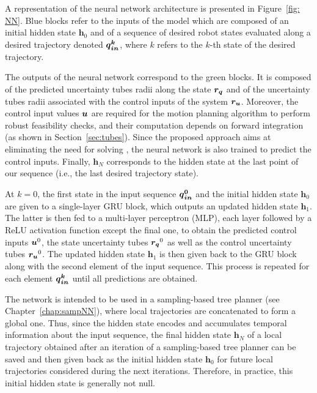 A representation of the neural network architecture is presented in Figure~\ref{fig: NN}.
Blue blocks refer to the inputs of the model which are composed of an initial hidden state $\boldsymbol{h}_{0}$ and of a sequence of desired robot states evaluated along a desired trajectory denoted $\boldsymbol{\boldsymbol{q}_{in}^k}$, where $k$ refers to the $k$-th state of the desired trajectory. 

The outputs of the neural network correspond to the green blocks.
It is composed of the predicted uncertainty tubes radii along the state $\boldsymbol{r_q}$ and of the uncertainty tubes radii associated with the control inputs of the system $\boldsymbol{r_u}$.
Moreover, the control input values $\boldsymbol{u}$ are required for the motion planning algorithm to perform robust feasibility checks, and their computation depends on  forward integration (as shown in Section~\ref{sec:tubes}). 
Since the proposed approach aims at eliminating the need for solving , the neural network is also trained to predict the control inputs.
Finally, $\boldsymbol{h}_{N}$ corresponds to the hidden state at the last point of our sequence (i.e., the last desired trajectory state).

At $k=0$, the first state in the input sequence $\boldsymbol{\boldsymbol{q}_{in}^0}$ and the initial hidden state $\boldsymbol{h}_0$ are given to a single-layer GRU block, which outputs an updated hidden state $\boldsymbol{h}_1$. 
The latter is then fed to a multi-layer perceptron (MLP), each layer followed by a ReLU activation function except the final one, to obtain the predicted control inputs $\boldsymbol{u}^0$, the state uncertainty tubes $\boldsymbol{r_q}^0$ as well as the control uncertainty tubes $\boldsymbol{r_u}^0$. 
The updated hidden state $\boldsymbol{h}_1$ is then given back to the GRU block along with the second element of the input sequence. 
This process is repeated for each element $\boldsymbol{\boldsymbol{q}_{in}^k}$ until all predictions are obtained.

The network is intended to be used in a sampling-based tree planner (see Chapter~\ref{chap:sampNN}), where local trajectories are concatenated to form a global one. 
Thus, since the hidden state encodes and accumulates temporal information about the input sequence, the final hidden state $\boldsymbol{h}_{N}$ of a local trajectory obtained after an iteration of a sampling-based tree planner can be saved and then given back as the initial hidden state $\boldsymbol{h}_{0}$ for future local trajectories considered during the next iterations. 
Therefore, in practice, this initial hidden state is generally not null.

